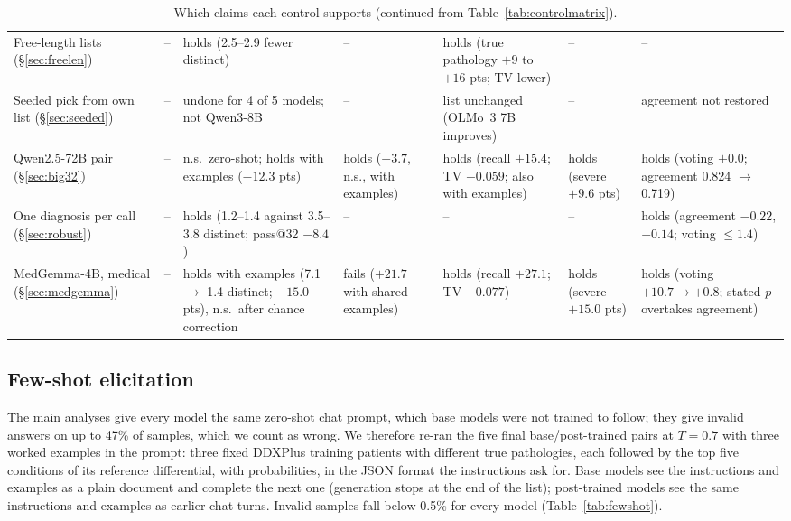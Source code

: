 \documentclass[wcp]{jmlr}
\begin{document}
\begin{table}[p]
\begin{tabular}{L{2.2cm}L{1.7cm}L{2.0cm}L{1.8cm}L{2.0cm}L{2.3cm}L{1.9cm}}
Free-length lists (\S\ref{sec:freelen}) & -- & holds (2.5--2.9 fewer distinct) & -- & holds (true pathology $+9$ to $+16$ pts; TV lower) & -- & -- \\
Seeded pick from own list (\S\ref{sec:seeded}) & -- & undone for 4 of 5 models; not Qwen3-8B & -- & list unchanged (OLMo~3 7B improves) & -- & agreement not restored \\
Qwen2.5-72B pair (\S\ref{sec:big32}) & -- & n.s.\ zero-shot; holds with examples ($-12.3$ pts) & holds ($+3.7$, n.s., with examples) & holds (recall $+15.4$; TV $-0.059$; also with examples) & holds (severe $+9.6$ pts) & holds (voting $+0.0$; agreement 0.824 $\rightarrow$ 0.719) \\
One diagnosis per call (\S\ref{sec:robust}) & -- & holds (1.2--1.4 against 3.5--3.8 distinct; pass@32 $-8.4$) & -- & -- & -- & holds (agreement $-0.22$, $-0.14$; voting $\leq 1.4$) \\
MedGemma-4B, medical (\S\ref{sec:medgemma}) & -- & holds with examples (7.1 $\rightarrow$ 1.4 distinct; $-15.0$ pts), n.s.\ after chance correction & fails ($+21.7$ with shared examples) & holds (recall $+27.1$; TV $-0.077$) & holds (severe $+15.0$ pts) & holds (voting $+10.7 \rightarrow +0.8$; stated $p$ overtakes agreement) \\
\bottomrule
\end{tabular}
\caption{Which claims each control supports (continued from Table~\ref{tab:controlmatrix}).}
\label{tab:controlmatrix2}
\end{table}


\subsection{Few-shot elicitation}\label{sec:fewshot}
The main analyses give every model the same zero-shot chat prompt, which base models were not trained to follow; they give invalid answers on up to 47\% of samples, which we count as wrong. We therefore re-ran the five final base/post-trained pairs at $T{=}0.7$ with three worked examples in the prompt: three fixed DDXPlus training patients with different true pathologies, each followed by the top five conditions of its reference differential, with probabilities, in the JSON format the instructions ask for. Base models see the instructions and examples as a plain document and complete the next one (generation stops at the end of the list); post-trained models see the same instructions and examples as earlier chat turns. Invalid samples fall below 0.5\% for every model (Table~\ref{tab:fewshot}).
\end{document}
